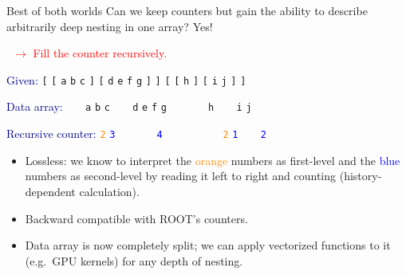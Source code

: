 \documentclass{beamer}
\begin{document}
\begin{frame}{Best of both worlds}
\vspace{0.5 cm}
Can we keep counters but gain the ability to describe arbitrarily deep nesting in one array? Yes!

\vspace{0.2 cm}
\textcolor{red}{\mbox{\hspace{1 cm} $\rightarrow$} Fill the counter recursively.}

\vspace{0.3 cm}
\textcolor{darkblue}{Given:} \hfill {\tt [} {\tt [} {\tt a} {\tt b} {\tt c} {\tt ]} {\tt [} {\tt d} {\tt e} {\tt f} {\tt g} {\tt ]} {\tt ]} {\tt [} {\tt [} {\tt h} {\tt ]} {\tt [} {\tt i} {\tt j} {\tt ]} {\tt ]}

\textcolor{darkblue}{Data array:} \hfill {\tt \ } {\tt \ } {\tt a} {\tt b} {\tt c} {\tt \ } {\tt \ } {\tt d} {\tt e} {\tt f} {\tt g} {\tt \ } {\tt \ } {\tt \ } {\tt \ } {\tt h} {\tt \ } {\tt \ } {\tt i} {\tt j} {\tt \ } {\tt \ }

\textcolor{darkblue}{Recursive counter:} \hfill \textcolor{darkorange}{\tt 2} \textcolor{blue}{\tt 3} {\tt \ } {\tt \ } {\tt \ } {\tt \ } \textcolor{blue}{\tt 4} {\tt \ } {\tt \ } {\tt \ } {\tt \ } {\tt \ } {\tt \ } \textcolor{darkorange}{\tt 2} \textcolor{blue}{\tt 1} {\tt \ } {\tt \ } \textcolor{blue}{\tt 2} {\tt \ } {\tt \ } {\tt \ } {\tt \ }

\vspace{0.3 cm}
\begin{itemize}
\item Lossless: we know to interpret the \textcolor{darkorange}{orange} numbers as first-level and the \textcolor{blue}{blue} numbers as second-level by reading it left to right and counting (history-dependent calculation).

\item Backward compatible with ROOT's counters.

\item Data array is now completely split; we can apply vectorized functions to it (e.g.\ GPU kernels) for any depth of nesting.
\end{itemize}
\end{frame}
\end{document}

